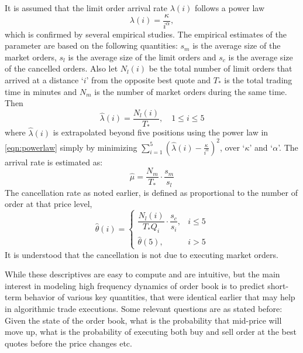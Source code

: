 It is assumed that the limit order arrival rate $\lambda(i)$ follows a power law
	\begin{equation} \label{eqn:powerlaw}
	\lambda(i)=\dfrac{\kappa}{i^\alpha},
	\end{equation}
which is confirmed by several empirical studies. The empirical estimates of the parameter are based on the following quantities: $s_m$ is the average size of the market orders, $s_l$ is the average size of the limit orders and $s_c$ is the average size of the cancelled orders. Also let $N_l(i)$ be the total number of limit orders that arrived at a distance `$i$' from the opposite best quote and $T_*$ is the total trading time in minutes and $N_m$ is the number of market orders during the same time. Then 
	\begin{equation} \label{eqn:hatlambdant}
	\hat{\lambda}(i)= \dfrac{N_l(i)}{T_*}, \quad 1 \leq i \leq 5
	\end{equation}
where $\hat{\lambda}(i)$ is extrapolated beyond five positions using the power law in \eqref{eqn:powerlaw} simply by minimizing $\sum_{i=1}^5 (\hat{\lambda}(i) - \frac{\kappa}{i^\alpha})^2$, over `$\kappa$' and `$\alpha$'. The arrival rate is estimated as:
	\begin{equation} \label{eqn:hatnmt}
	\hat{\mu}=\dfrac{N_m}{T_*} \cdot \dfrac{s_m}{s_l}
	\end{equation}
The cancellation rate as noted earlier, is defined as proportional to the number of order at that price level,
	\begin{equation} \label{eqn:hatthetacase}
	\hat{\theta}(i)=
	\begin{cases}
	\dfrac{N_l(i)}{T_*Q_i} \cdot \dfrac{s_c}{s_i}, & i \leq 5 \\
	\hat{\theta}(5), & i>5
	\end{cases}
	\end{equation}
It is understood that the cancellation is not due to executing market orders.


While these descriptives are easy to compute and are intuitive, but the main interest in modeling high frequency dynamics of order book is to predict short-term behavior of various key quantities, that were identical earlier that may help in algorithmic trade executions. Some relevant questions are as stated before: Given the state of the order book, what is the probability that mid-price will move up, what is the probability of executing both buy and sell order at the best quotes before the price changes etc.


